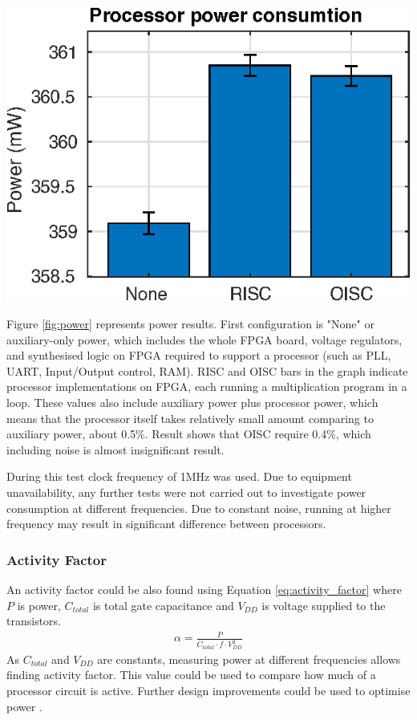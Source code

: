\begin{colfigure}
	\centering
	\includegraphics[width=\linewidth]{../tests/power.eps}
	\label{fig:power}
\end{colfigure}

Figure \ref{fig:power} represents power results. First configuration is "None" or auxiliary-only power, which includes the whole FPGA board, voltage regulators, and synthesised logic on FPGA required to support a processor (such as PLL, UART, Input/Output control, RAM). RISC and OISC bars in the graph indicate processor implementations on FPGA, each running a multiplication program in a loop. These values also include auxiliary power plus processor power, which means that the processor itself takes relatively small amount comparing to auxiliary power, about 0.5\%. Result shows that OISC require 0.4\%, which including noise is almost insignificant result.

During this test clock frequency of 1MHz was used. Due to equipment unavailability, any further tests were not carried out to investigate power consumption at different frequencies. Due to constant noise, running at higher frequency may result in significant difference between processors.

\subsubsection{Activity Factor}\label{subsec:activity_factor}
An activity factor could be also found using Equation \ref{eq:activity_factor} where $P$ is power, $C_{total}$ is total gate capacitance and $V_{DD}$ is voltage supplied to the transistors.
\begin{align}\label{eq:activity_factor}
\alpha = \frac{P}{C_{total}\cdot f \cdot V_{DD}^2}
\end{align}
As $C_{total}$ and $V_{DD}$ are constants, measuring power at different frequencies allows finding activity factor. This value could be used to compare how much of a processor circuit is active. Further design improvements could be used to optimise power \autocite{8682289,7363689,1207041,6972455}.


